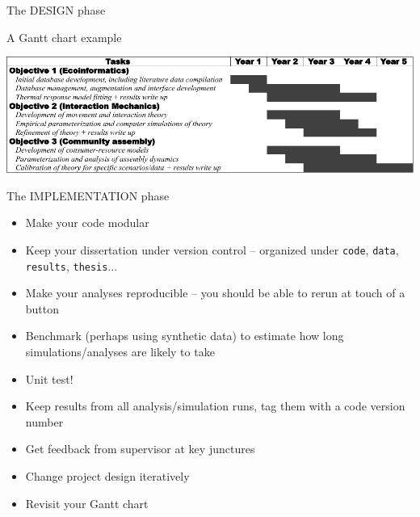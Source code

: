 \documentclass[xcolor=x11names,compress]{beamer}
\renewcommand{\(}{\begin{columns}}
\renewcommand{\)}{\end{columns}}
\newcommand{\<}[1]{\begin{column}{#1}}
\renewcommand{\>}{\end{column}}
\begin{document}
\begin{frame}{The DESIGN phase}

    \centering 
A Gantt chart example
    
    \vspace{10pt}
 \includegraphics[width=\textwidth]{Timeline.pdf}

\end{frame}

\begin{frame}{The IMPLEMENTATION phase}

  \begin{itemize}[<+->]\itemsep6pt
    \item Make your code modular
    \item Keep your dissertation under version control -- organized under {\tt code}, {\tt data}, {\tt results}, {\tt thesis}... 
    \item Make your analyses reproducible -- you should be able to rerun at touch of a button
    \item Benchmark (perhaps using synthetic data) to estimate how long simulations/analyses are likely to take
    \item Unit test! 
    \item Keep results from all analysis/simulation runs, tag them with a code version number
    \item Get feedback from supervisor at key junctures
    \item Change project design iteratively
    \item Revisit your Gantt chart
 \end{itemize}

\end{frame}
\end{document}
